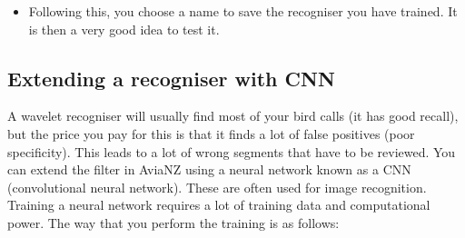 \documentclass{scrartcl}
\begin{document}
\begin{itemize}



\item Following this, you choose a name to save the recogniser you have trained. It is then a very good idea to test it. 
\end{itemize}

\subsection{Extending a recogniser with CNN}\label{sec:cnnfilter}

A wavelet recogniser will usually find most of your bird calls (it has good recall), but the price you pay for this is that it finds a lot of false positives (poor specificity). This leads to a lot of wrong segments that have to be reviewed. You can extend the filter in AviaNZ using a neural network known as a CNN (convolutional neural network). These are often used for image recognition. Training a neural network requires a lot of training data and computational power. The way that you perform the training is as follows:
\end{document}
